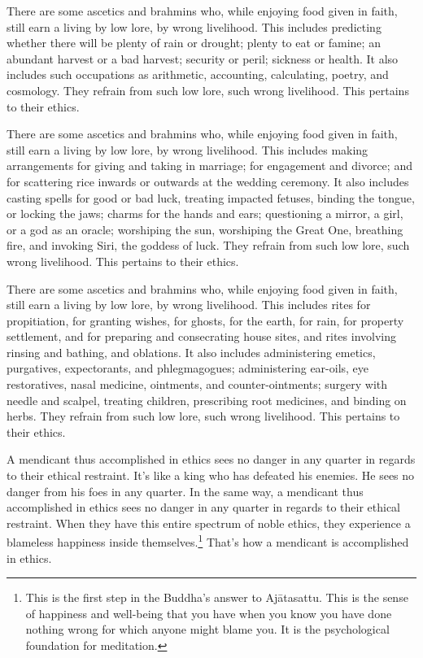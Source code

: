 \documentclass[12pt,openany]{book}%
\begin{document}
There are some ascetics and brahmins who, while enjoying food given in faith, still earn a living by low lore, by wrong livelihood. This includes predicting whether there will be plenty of rain or drought; plenty to eat or famine; an abundant harvest or a bad harvest; security or peril; sickness or health. It also includes such occupations as arithmetic, accounting, calculating, poetry, and cosmology. They refrain from such low lore, such wrong livelihood. This pertains to their ethics. 

There are some ascetics and brahmins who, while enjoying food given in faith, still earn a living by low lore, by wrong livelihood. This includes making arrangements for giving and taking in marriage; for engagement and divorce; and for scattering rice inwards or outwards at the wedding ceremony. It also includes casting spells for good or bad luck, treating impacted fetuses, binding the tongue, or locking the jaws; charms for the hands and ears; questioning a mirror, a girl, or a god as an oracle; worshiping the sun, worshiping the Great One, breathing fire, and invoking Siri, the goddess of luck. They refrain from such low lore, such wrong livelihood. This pertains to their ethics. 

There are some ascetics and brahmins who, while enjoying food given in faith, still earn a living by low lore, by wrong livelihood. This includes rites for propitiation, for granting wishes, for ghosts, for the earth, for rain, for property settlement, and for preparing and consecrating house sites, and rites involving rinsing and bathing, and oblations. It also includes administering emetics, purgatives, expectorants, and phlegmagogues; administering ear-oils, eye restoratives, nasal medicine, ointments, and counter-ointments; surgery with needle and scalpel, treating children, prescribing root medicines, and binding on herbs. They refrain from such low lore, such wrong livelihood. This pertains to their ethics. 

A mendicant thus accomplished in ethics sees no danger in any quarter in regards to their ethical restraint. It’s like a king who has defeated his enemies. He sees no danger from his foes in any quarter. In the same way, a mendicant thus accomplished in ethics sees no danger in any quarter in regards to their ethical restraint. When they have this entire spectrum of noble ethics, they experience a blameless happiness inside themselves.\footnote{This is the first step in the Buddha’s answer to \textsanskrit{Ajātasattu}. This is the sense of happiness and well-being that you have when you know you have done nothing wrong for which anyone might blame you. It is the psychological foundation for meditation. } That’s how a mendicant is accomplished in ethics. 
\end{document}
